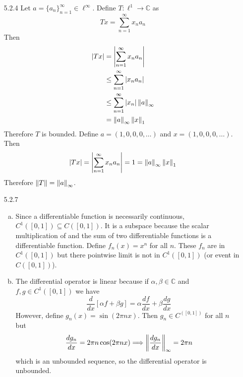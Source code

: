 \documentclass[../../Solutions.tex]{subfiles}
\begin{document}
\begin{itemize}
	\item [5.2.4] Let $a = \{a_n\}_{n=1}^\infty \in \ell^\infty$. Define $T:\ell^1\to\mathbb{C}$ as
		$$ Tx = \sum_{n=1}^\infty x_na_n $$
		Then
		\begin{equation*} \begin{split} 
			|Tx| &= \left|\sum_{n=1}^\infty x_n a_n\right| \\
				&\leq \sum_{n=1}^\infty |x_n a_n| \\
				&\leq \sum_{n=1}^\infty |x_n|\left\lVert a\right\rVert_\infty \\
				&= \left\lVert a\right\rVert_\infty \left\lVert x\right\rVert_1
		\end{split} \end{equation*}
		Therefore $T$ is bounded.
		Define $a = (1,0,0,0,\dots)$ and $x = (1,0,0,0,\dots)$. Then
		$$ |Tx| = \left|\sum_{n=1}^\infty x_n a_n\right| = 1 = \left\lVert a\right\rVert_\infty \left\lVert x\right\rVert_1 $$
		Therefore $\left\lVert T\right\rVert = \left\lVert a\right\rVert_\infty$.
		
	\item [5.2.7]
	\begin{enumerate}[(a)]
		\item Since a differentiable function is necessarily continuous, $C^1([0,1]) \subseteq C([0,1])$.
			It is a subspace because the scalar multiplication of and the sum of two differentiable functions is a differentiable function.
			Define $f_n(x) = x^n$ for all $n$. These $f_n$ are in $C^1([0,1])$ but there pointwise limit is not in $C^1([0,1])$ (or event in $C([0,1])$).
		\item The differential operator is linear because if $\alpha,\beta \in \mathbb{C}$ and $f,g \in C^1([0,1])$ we have
		$$ \frac{d}{dx}\left[\alpha f + \beta g\right] = \alpha \frac{df}{dx} + \beta \frac{dg}{dx} $$
		However, define $g_n(x) = \sin(2\pi nx)$. Then $g_n \in C^([0,1])$ for all $n$ but
		$$ \frac{dg_n}{dx} = 2\pi n\cos(2\pi nx) \Longrightarrow \left\lVert\frac{dg_n}{dx}\right\rVert_\infty = 2\pi n $$
		which is an unbounded sequence, so the differential operator is unbounded.
	\end{enumerate}
	
\end{itemize}
\end{document}
